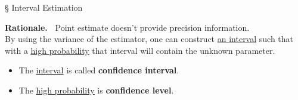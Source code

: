 \begin{frame}{\S{} Interval Estimation}

 {\bf Rationale.~} Point estimate doesn't provide precision information. \\[1em]
  By using the variance of the estimator, one can construct \underline{an interval} such that with a \underline{\underline{high probability}} that interval will contain the unknown parameter.
 \\[1em]
 \begin{itemize}
  \item The \underline{interval} is called {\bf confidence interval}.\\[1em]
  \item The \underline{\underline{high probability}} is {\bf confidence level}.
 \end{itemize}
 \end{frame}

